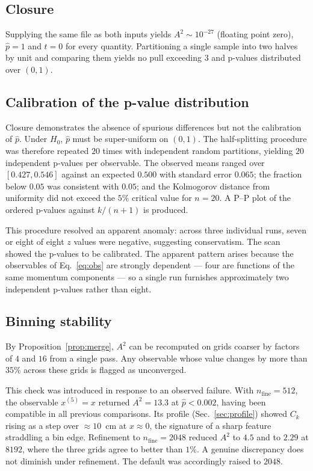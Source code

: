 \documentclass[11pt,a4paper]{article}
\theoremstyle{definition}
\theoremstyle{plain}
\theoremstyle{remark}
\begin{document}
\subsection{Closure}

Supplying the same file as both inputs yields $A^{2} \sim 10^{-27}$ (floating
point zero), $\hat{p} = 1$ and $t = 0$ for every quantity. Partitioning a single
sample into two halves by unit and comparing them yields no pull exceeding $3$
and p-values distributed over $(0,1)$.

\subsection{Calibration of the p-value distribution}

Closure demonstrates the absence of spurious differences but not the calibration
of $\hat{p}$. Under $H_0$, $\hat{p}$ must be super-uniform on $(0,1)$. The
half-splitting procedure was therefore repeated $20$ times with independent
random partitions, yielding $20$ independent p-values per observable. The
observed means ranged over $[0.427, 0.546]$ against an expected $0.500$ with
standard error $0.065$; the fraction below $0.05$ was consistent with $0.05$;
and the Kolmogorov distance from uniformity did not exceed the $5\%$ critical
value for $n=20$. A P--P plot of the ordered p-values against $k/(n+1)$ is
produced.

This procedure resolved an apparent anomaly: across three individual runs,
seven or eight of eight $z$ values were negative, suggesting conservatism. The
scan showed the p-values to be calibrated. The apparent pattern arises because
the observables of Eq.~\eqref{eq:obs} are strongly dependent --- four are
functions of the same momentum components --- so a single run furnishes
approximately two independent p-values rather than eight.

\subsection{Binning stability}
\label{sec:binstab}

By Proposition~\ref{prop:merge}, $A^{2}$ can be recomputed on grids coarser by
factors of $4$ and $16$ from a single pass. Any observable whose value changes
by more than $35\%$ across these grids is flagged as unconverged.

This check was introduced in response to an observed failure. With
$n_{\mathrm{fine}} = 512$, the observable $x^{(5)} = x$ returned $A^{2} = 13.3$
at $\hat{p} < 0.002$, having been compatible in all previous comparisons. Its
profile (Sec.~\ref{sec:profile}) showed $C_k$ rising as a step over
$\approx 10$~cm at $x \approx 0$, the signature of a sharp feature straddling a
bin edge. Refinement to $n_{\mathrm{fine}} = 2048$ reduced $A^{2}$ to $4.5$ and
to $2.29$ at $8192$, where the three grids agree to better than $1\%$. A genuine
discrepancy does not diminish under refinement. The default was accordingly
raised to $2048$.
\end{document}
